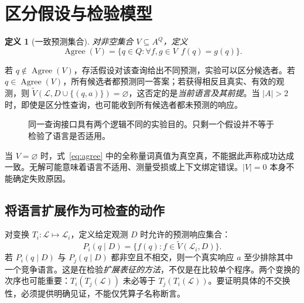 \documentclass[11pt,a4paper,UTF8,fontset=none]{ctexart}
\newtheorem{definition}{定义}[section]
\newcommand{\VS}{\widetilde V}
\newcommand{\Agree}{\operatorname{Agree}}
\begin{document}
\section{区分假设与检验模型}

\begin{definition}[一致预测集合]
对\emph{非空}集合 $V\subseteq A^Q$，定义
\begin{equation}\label{eq:agree}
\Agree(V)=\{q\in Q:\forall f,g\in V\ \ f(q)=g(q)\}.
\end{equation}
\end{definition}

若 $q\notin\Agree(V)$，存活假设对该查询给出不同预测，实验可以区分候选者。若 $q\in\Agree(V)$，所有候选者都预测同一答案；若获得相反且真实、有效的观测，则 $\VS(\mathcal L,D\cup\{(q,a)\})=\varnothing$，这否定的是\emph{当前语言及其前提}。当 $|A|>2$ 时，即使是区分性查询，也可能收到所有候选者都未预测的响应。

\begin{figure}[htbp]
\centering
{}
\caption{同一查询接口具有两个逻辑不同的实验目的。只剩一个假设并不等于检验了语言是否适用。}\label{fig:query}
\end{figure}

当 $V=\varnothing$ 时，式~\eqref{eq:agree} 中的全称量词真值为真空真，不能据此声称成功达成一致。无解可能意味着语言不适用、测量受损或上下文绑定错误。$|V|=0$ 本身不能确定失败原因。

\subsection{将语言扩展作为可检查的动作}

对变换 $T_i:\mathcal L\mapsto\mathcal L_i$，定义给定观测 $D$ 时允许的预测响应集合：
\begin{equation}\label{eq:cross}
P_i(q\mid D)=\{f(q):f\in\VS(\mathcal L_i,D)\}.
\end{equation}
若 $P_i(q\mid D)$ 与 $P_j(q\mid D)$ 都非空且不相交，则一个真实响应 $a$ 至少排除其中一个竞争语言。这是在检验\emph{扩展表征的方法}，不仅是在比较单个程序。两个变换的次序也可能重要：$T_i(T_j(\mathcal L))$ 未必等于 $T_j(T_i(\mathcal L))$。要证明具体的不交换性，必须提供明确见证，不能仅凭算子名称断言。
\end{document}
